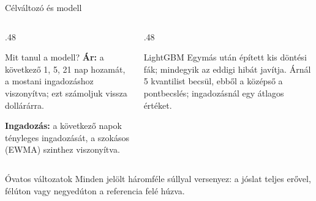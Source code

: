 \documentclass[aspectratio=169,11pt]{beamer}
\begin{document}
\begin{frame}{Célváltozó és modell}
  \begin{columns}[T,onlytextwidth]
    \begin{column}{.48\textwidth}
      \begin{block}{Mit tanul a modell?}
        \small
        \textbf{Ár:} a következő 1, 5, 21 nap hozamát, a mostani
        ingadozáshoz viszonyítva; ezt számoljuk vissza dollárárra.\par\smallskip
        \textbf{Ingadozás:} a következő napok tényleges ingadozását,
        a szokásos (EWMA) szinthez viszonyítva.
      \end{block}
    \end{column}
    \begin{column}{.48\textwidth}
      \begin{block}{LightGBM}
        \small Egymás után épített kis döntési fák; mindegyik az eddigi
        hibát javítja. Árnál 5 kvantilist becsül, ebből a középső a
        pontbecslés; ingadozásnál egy átlagos értéket.
      \end{block}
    \end{column}
  \end{columns}
  \medskip
  \begin{block}{Óvatos változatok}
    \small Minden jelölt háromféle súllyal versenyez: a jóslat teljes
    erővel, félúton vagy negyedúton a referencia felé húzva.
  \end{block}
\end{frame}
\end{document}
